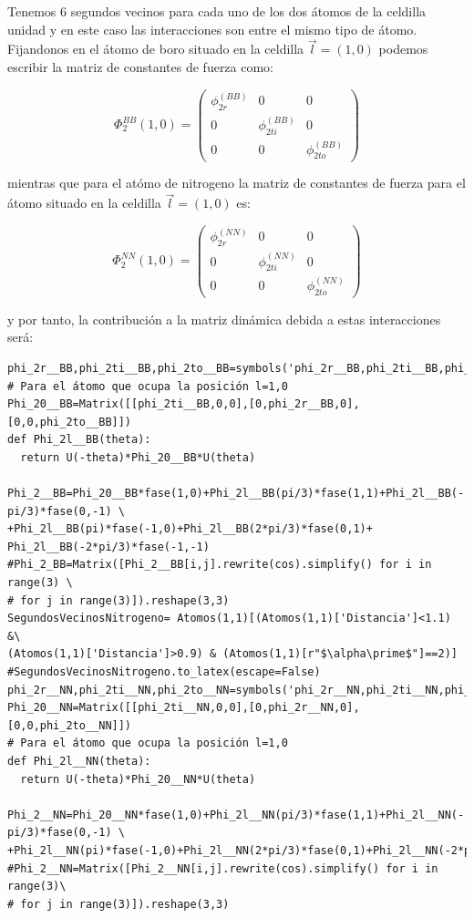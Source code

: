 \documentclass[12pt,a4paper]{article}
\begin{document}
Tenemos \(6\) segundos vecinos para cada uno de los dos átomos de la celdilla unidad y en este caso las interacciones son entre el mismo tipo de átomo. Fijandonos en el átomo de boro situado en la celdilla \(\vec l=(1,0)\) podemos escribir la matriz de constantes de fuerza como:

\begin{equation}
\Phi_{2}^{BB}(1,0)=\begin{pmatrix}
\phi_{2r}^{(BB)} & 0 & 0 \\
0 & \phi_{2ti}^{(BB)} & 0 \\
 0 & 0  & \phi_{2to}^{(BB)}
\end{pmatrix}
\end{equation} 

mientras que para el atómo de nitrogeno la matriz de constantes de fuerza para el átomo situado en la celdilla \(\vec l =(1,0)\) es:

\begin{equation}
\Phi_{2}^{NN}(1,0)=\begin{pmatrix}
\phi_{2r}^{(NN)} & 0 & 0 \\
0 & \phi_{2ti}^{(NN)} & 0 \\
 0 & 0  & \phi_{2to}^{(NN)}
\end{pmatrix}
\end{equation} 

y por tanto, la contribución a la matriz dinámica debida a estas interacciones será:

\begin{verbatim}
phi_2r__BB,phi_2ti__BB,phi_2to__BB=symbols('phi_2r__BB,phi_2ti__BB,phi_2to__BB')
# Para el átomo que ocupa la posición l=1,0
Phi_20__BB=Matrix([[phi_2ti__BB,0,0],[0,phi_2r__BB,0],[0,0,phi_2to__BB]])
def Phi_2l__BB(theta):
  return U(-theta)*Phi_20__BB*U(theta)

Phi_2__BB=Phi_20__BB*fase(1,0)+Phi_2l__BB(pi/3)*fase(1,1)+Phi_2l__BB(-pi/3)*fase(0,-1) \
+Phi_2l__BB(pi)*fase(-1,0)+Phi_2l__BB(2*pi/3)*fase(0,1)+ Phi_2l__BB(-2*pi/3)*fase(-1,-1)
#Phi_2_BB=Matrix([Phi_2__BB[i,j].rewrite(cos).simplify() for i in range(3) \
# for j in range(3)]).reshape(3,3)
SegundosVecinosNitrogeno= Atomos(1,1)[(Atomos(1,1)['Distancia']<1.1) &\
(Atomos(1,1)['Distancia']>0.9) & (Atomos(1,1)[r"$\alpha\prime$"]==2)]
#SegundosVecinosNitrogeno.to_latex(escape=False)
phi_2r__NN,phi_2ti__NN,phi_2to__NN=symbols('phi_2r__NN,phi_2ti__NN,phi_2to__NN')
Phi_20__NN=Matrix([[phi_2ti__NN,0,0],[0,phi_2r__NN,0],[0,0,phi_2to__NN]])
# Para el átomo que ocupa la posición l=1,0
def Phi_2l__NN(theta):
  return U(-theta)*Phi_20__NN*U(theta)

Phi_2__NN=Phi_20__NN*fase(1,0)+Phi_2l__NN(pi/3)*fase(1,1)+Phi_2l__NN(-pi/3)*fase(0,-1) \
+Phi_2l__NN(pi)*fase(-1,0)+Phi_2l__NN(2*pi/3)*fase(0,1)+Phi_2l__NN(-2*pi/3)*fase(-1,-1)
#Phi_2__NN=Matrix([Phi_2__NN[i,j].rewrite(cos).simplify() for i in range(3)\
# for j in range(3)]).reshape(3,3)

\end{verbatim}
\end{document}
